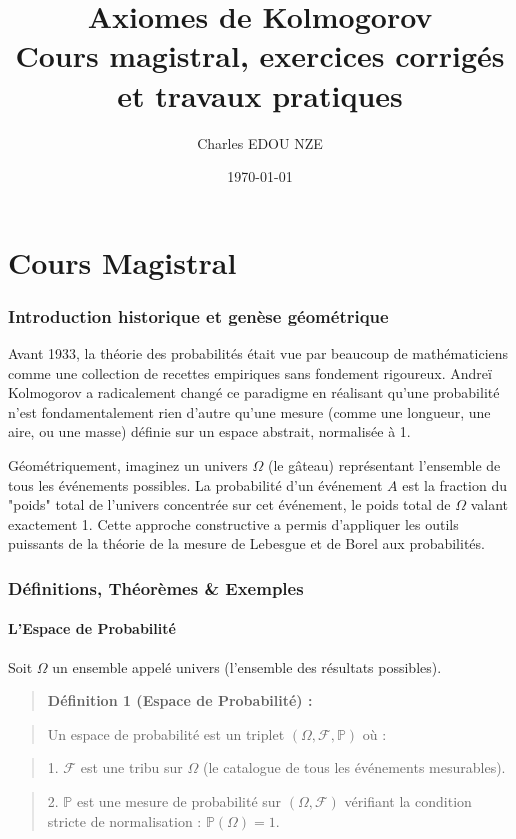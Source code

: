 \documentclass[11pt,a4paper]{article}
\title{\Huge Axiomes de Kolmogorov \\ \large Cours magistral, exercices corrigés et travaux pratiques}
\author{\Large Charles EDOU NZE}
\date{\today}
\begin{document}
\maketitle
\tableofcontents
\newpage

\part{Cours Magistral}


\section{Introduction historique et genèse géométrique}

Avant 1933, la théorie des probabilités était vue par beaucoup de mathématiciens comme une collection de recettes empiriques sans fondement rigoureux. Andreï Kolmogorov a radicalement changé ce paradigme en réalisant qu'une probabilité n'est fondamentalement rien d'autre qu'une mesure (comme une longueur, une aire, ou une masse) définie sur un espace abstrait, normalisée à 1.

Géométriquement, imaginez un univers $\Omega$ (le gâteau) représentant l'ensemble de tous les événements possibles. La probabilité d'un événement $A$ est la fraction du "poids" total de l'univers concentrée sur cet événement, le poids total de $\Omega$ valant exactement 1. Cette approche constructive a permis d'appliquer les outils puissants de la théorie de la mesure de Lebesgue et de Borel aux probabilités.

\section{Définitions, Théorèmes \& Exemples}

\subsection{L'Espace de Probabilité}

Soit $\Omega$ un ensemble appelé univers (l'ensemble des résultats possibles).

\begin{quote}\textbf{Définition 1 (Espace de Probabilité) :}\end{quote}
\begin{quote}Un espace de probabilité est un triplet $(\Omega, \mathcal{F}, \mathbb{P})$ où :\end{quote}
\begin{quote}1. $\mathcal{F}$ est une tribu sur $\Omega$ (le catalogue de tous les événements mesurables).\end{quote}
\begin{quote}2. $\mathbb{P}$ est une mesure de probabilité sur $(\Omega, \mathcal{F})$ vérifiant la condition stricte de normalisation : $\mathbb{P}(\Omega) = 1$.\end{quote}
\end{document}
